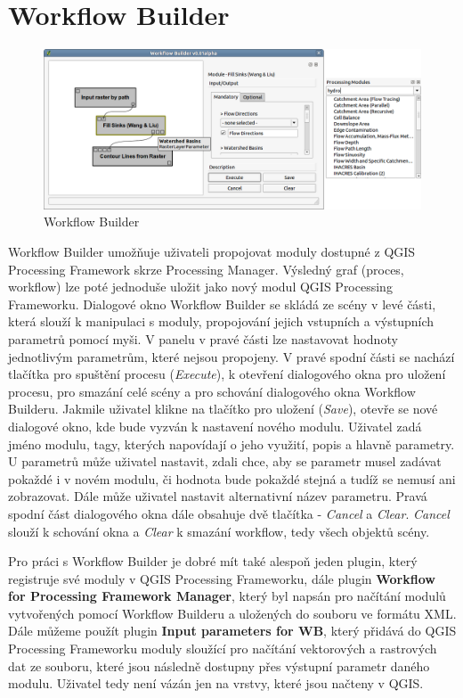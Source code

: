 \newpage
\chapter{Workflow Builder}

\begin{figure}[h]
	\centering
	\includegraphics[scale=0.38]{pictures/wf/wf_pm}
	\caption{Workflow Builder}
  	\label{wf}
\end{figure}

Workflow Builder umožňuje uživateli propojovat moduly dostupné z QGIS Processing Framework skrze Processing Manager. Výsledný graf (proces, workflow) lze poté jednoduše uložit jako nový modul QGIS Processing Frameworku. Dialogové okno Workflow Builder se skládá ze scény v levé části, která slouží k manipulaci s moduly, propojování jejich vstupních a výstupních parametrů pomocí myši. V panelu v pravé části lze nastavovat hodnoty jednotlivým parametrům, které nejsou propojeny. V pravé spodní části se nachází tlačítka pro spuštění procesu (\textit{Execute}), k otevření dialogového okna pro uložení procesu, pro smazání celé scény a pro schování dialogového okna Workflow Builderu. Jakmile uživatel klikne na tlačítko pro uložení (\textit{Save}), otevře se nové dialogové okno, kde bude vyzván k nastavení nového modulu. Uživatel zadá jméno modulu, tagy, kterých napovídají o jeho využití, popis a hlavně parametry. U parametrů může uživatel nastavit, zdali chce, aby se parametr musel zadávat pokaždé i v novém modulu, či hodnota bude pokaždé stejná a tudíž se nemusí ani zobrazovat. Dále může uživatel nastavit alternativní název parametru. Pravá spodní část dialogového okna dále obsahuje dvě tlačítka - \textit{Cancel} a \textit{Clear}. \textit{Cancel} slouží k schování okna a \textit{Clear} k smazání workflow, tedy všech objektů scény.

Pro práci s Workflow Builder je dobré mít také alespoň jeden plugin, který registruje své moduly v QGIS Processing Frameworku, dále plugin \textbf{Workflow for Processing Framework Manager}, který byl napsán pro načítání modulů vytvořených pomocí Workflow Builderu a uložených do souboru ve formátu XML. Dále můžeme použít plugin \textbf{Input parameters for WB}, který přidává do QGIS Processing Frameworku moduly sloužící pro načítání vektorových a rastrových dat ze souboru, které jsou následně dostupny přes výstupní parametr daného modulu. Uživatel tedy není vázán jen na vrstvy, které jsou načteny v QGIS.\\

